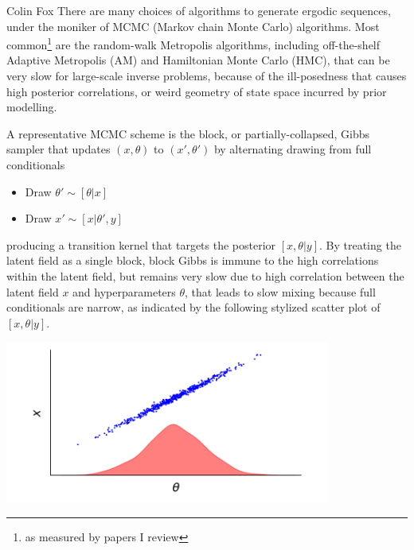 \documentclass{owrart}
\theoremstyle{plain}
\begin{document}
\begin{talk}{Colin Fox}
There are many choices of algorithms to generate ergodic sequences, under the moniker of MCMC (Markov chain Monte Carlo) algorithms. Most common\footnote{as measured by papers I review} are the random-walk Metropolis algorithms, including off-the-shelf Adaptive Metropolis (AM) and Hamiltonian Monte Carlo (HMC), that can be very slow for large-scale inverse problems, because of the ill-posedness that causes high posterior correlations, or weird geometry of state space incurred by prior modelling.

A representative MCMC scheme is the block, or partially-collapsed, Gibbs sampler that updates  $(x,\theta)$ to $(x',\theta')$ by alternating drawing from full conditionals
\begin{itemize}
 \item Draw $\theta'\sim [\theta|x]$
 \item Draw $x' \sim [x|\theta',y]$
\end{itemize}
producing a
transition kernel that targets the posterior $[x,\theta|y]$.
By treating the latent field as a single block, block Gibbs is immune to the high correlations within the latent field, but remains very slow due to high correlation between the latent field $x$ and hyperparameters $\theta$, that leads to slow mixing because full conditionals are narrow, as indicated by the following stylized scatter plot of $[x,\theta|y]$.\\
\centerline{\includegraphics[width=0.8\textwidth]{scatterplotmarginal.png}}


\end{talk}
\end{document}
